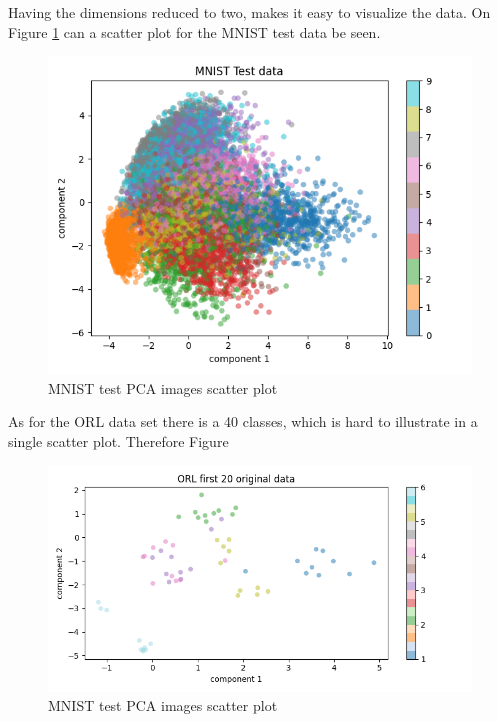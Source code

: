Having the dimensions reduced to two, makes it easy to visualize the data. On Figure \ref{fig:mnist-scatter} can a scatter plot for the MNIST test data be seen. 

\begin{figure}[htbp]
    \centering
    \includegraphics[width=1\columnwidth]{../source/mnist/pictures/mnist-scatter.png}
    \caption{MNIST test PCA images scatter plot}
    \label{fig:mnist-scatter}
\end{figure}

As for the ORL data set there is a 40 classes, which is hard to illustrate in a single scatter plot. Therefore Figure \

\begin{figure}[htbp]
    \centering
    \includegraphics[width=1\columnwidth]{../source/orl/pictures/orl-scatter-original-first.png}
    \caption{MNIST test PCA images scatter plot}
    \label{fig:orl-scatter-first}
\end{figure}

